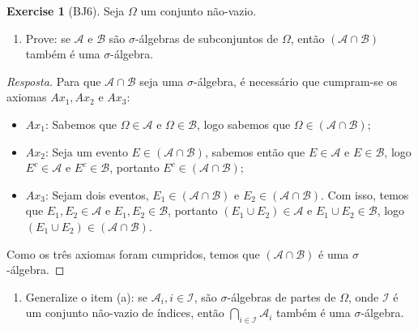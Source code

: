 \documentclass[
]{article}
\providecommand{\tightlist}{%
  \setlength{\itemsep}{0pt}\setlength{\parskip}{0pt}}
\theoremstyle{definition}
\theoremstyle{definition}
\theoremstyle{definition}
\newtheorem{exercise}{Exercise}[section]
\theoremstyle{definition}
\theoremstyle{remark}
\begin{document}
\begin{exercise}[BJ6]

Seja \(\Omega\) um conjunto não-vazio.

\begin{enumerate}
\def\labelenumi{\alph{enumi})}
\tightlist
\item
  Prove: se \(\mathcal{A}\) e \(\mathcal{B}\) são \(\sigma\)-álgebras de subconjuntos de \(\Omega\), então \((\mathcal{A} \cap \mathcal{B})\) também é uma \(\sigma\)-álgebra.
\end{enumerate}

\begin{proof}[Resposta]
Para que \(\mathcal{A} \cap \mathcal{B}\) seja uma \(\sigma\)-álgebra, é necessário que cumpram-se os axiomas \(Ax_{1}, Ax_{2}\) e \(Ax_{3}\):

\begin{itemize}
\tightlist
\item
  \(Ax_{1}\): Sabemos que \(\Omega \in \mathcal{A}\) e \(\Omega \in \mathcal{B}\), logo sabemos que \(\Omega \in (\mathcal{A} \cap \mathcal{B})\);
\item
  \(Ax_{2}\): Seja um evento \(E \in (\mathcal{A} \cap \mathcal{B})\), sabemos então que \(E \in \mathcal{A}\) e \(E \in \mathcal{B}\), logo \(E^{c} \in \mathcal{A}\) e \(E^{c} \in \mathcal{B}\), portanto \(E^{c} \in (\mathcal{A} \cap \mathcal{B})\);
\item
  \(Ax_{3}\): Sejam dois eventos, \(E_{1} \in (\mathcal{A} \cap \mathcal{B})\) e \(E_{2} \in (\mathcal{A} \cap \mathcal{B})\). Com isso, temos que \(E_{1}, E_{2} \in \mathcal{A}\) e \(E_{1}, E_{2} \in \mathcal{B}\), portanto \((E_{1} \cup E_{2}) \in \mathcal{A}\) e \(E_{1} \cup E_{2} \in \mathcal{B}\), logo \((E_{1} \cup E_{2}) \in (\mathcal{A} \cap \mathcal{B})\).
\end{itemize}

Como os três axiomas foram cumpridos, temos que \((\mathcal{A} \cap \mathcal{B})\) é uma \(\sigma\)-álgebra.
\end{proof}

\begin{enumerate}
\def\labelenumi{\alph{enumi})}
\setcounter{enumi}{1}
\tightlist
\item
  Generalize o item (a): se \(\mathcal{A}_{i}, i \in \mathcal{I}\), são \(\sigma\)-álgebras de partes de \(\Omega\), onde \(\mathcal{I}\) é um conjunto não-vazio de índices, então \(\bigcap_{i \in \mathcal{I}}\mathcal{A}_{i}\) também é uma \(\sigma\)-álgebra.
\end{enumerate}


\end{exercise}
\end{document}

